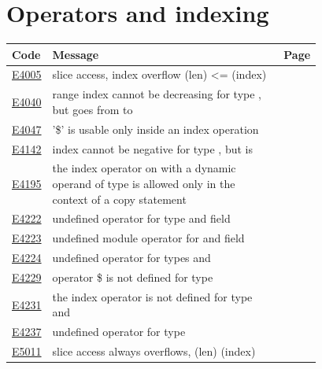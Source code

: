 
\clearpage
\section{Operators and indexing}
\label{sec:codes:operators}

\begin{longtable}{@{}l p{0.78\linewidth} r@{}}
\toprule Code & Message & Page\\ \midrule \endhead
\hyperref[sec:codes:e4005]{E4005} & slice access, index overflow \errhole{} (len) \textless{}= \errhole{} (index) & \pageref{sec:codes:e4005}\\
\hyperref[sec:codes:e4040]{E4040} & range index cannot be decreasing for type \errhole{}, but goes from \errhole{} to \errhole{} & \pageref{sec:codes:e4040}\\
\hyperref[sec:codes:e4047]{E4047} & '\$' is usable only inside an index operation & \pageref{sec:codes:e4047}\\
\hyperref[sec:codes:e4142]{E4142} & index cannot be negative for type \errhole{}, but is \errhole{} & \pageref{sec:codes:e4142}\\
\hyperref[sec:codes:e4195]{E4195} & the index operator on \errhole{} with a dynamic operand of type \errhole{} is allowed only in the context of a copy statement & \pageref{sec:codes:e4195}\\
\hyperref[sec:codes:e4222]{E4222} & undefined operator \errhole{} for type \errhole{} and field \errhole{} & \pageref{sec:codes:e4222}\\
\hyperref[sec:codes:e4223]{E4223} & undefined module operator \errhole{} for \errhole{} and field \errhole{} & \pageref{sec:codes:e4223}\\
\hyperref[sec:codes:e4224]{E4224} & undefined operator \errhole{} for types \errhole{} and \errhole{} & \pageref{sec:codes:e4224}\\
\hyperref[sec:codes:e4229]{E4229} & operator \$ is not defined for type \errhole{} & \pageref{sec:codes:e4229}\\
\hyperref[sec:codes:e4231]{E4231} & the index operator is not defined for type \errhole{} and \errhole{} & \pageref{sec:codes:e4231}\\
\hyperref[sec:codes:e4237]{E4237} & undefined operator \errhole{} for type \errhole{} & \pageref{sec:codes:e4237}\\
\hyperref[sec:codes:e5011]{E5011} & slice access always overflows, \errhole{} (len) \errhole{} \errhole{} (index) & \pageref{sec:codes:e5011}\\
\bottomrule
\end{longtable}

